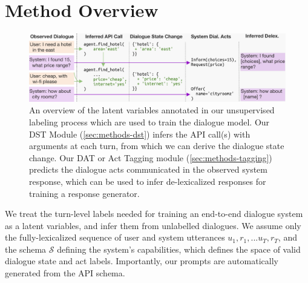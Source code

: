 \documentclass[11pt]{article}
\newcommand{\schema}[0]{\mathcal{S}}
\newcommand{\dstcolor}[1]{\textcolor{dst-color}{#1}}
\newcommand{\datcolor}[1]{\textcolor{dat-color}{#1}}
\newcommand{\bdk}[1]{}
\newcommand{\jmf}[1]{}
\begin{document}
\section{Method Overview}
\label{sec:methods-overview}
\begin{figure}
    \centering
    \includegraphics[width=\textwidth]{imgs/figure_2_latents_v4.pdf}
    \caption{An overview of the latent variables annotated in our unsupervised labeling process which are used to train the dialogue model. Our \dstcolor{DST Module} (\autoref{sec:methods-dst}) infers the API call(s) with arguments at each turn, from which we can derive the dialogue state change. Our \datcolor{DAT or Act Tagging module} (\autoref{sec:methods-tagging}) predicts the dialogue acts communicated in the observed system response, which can be used to infer de-lexicalized responses for training a response generator.\jmf{We could remove the dialogue state change column, and in the text say that we convert an API call to a dialogue state for evaluation (and give an example)} \bdk{Switched positions so its API -> dialogue state. Left it in as a column to make sure people who know MWoZ can very quickly understand the API call/state mapping}}
    \label{fig:latents-overview}
\end{figure}
We treat the turn-level labels needed for training an end-to-end dialogue system as a latent variables, and infer them from unlabelled dialogues.
We assume only the fully-lexicalized sequence of user and system utterances $u_1, r_1, ... u_T, r_T$, and the schema $\schema$ defining the system's capabilities, which defines the space of valid dialogue state and act labels. 
Importantly, our prompts are automatically generated from the API schema.
\end{document}
